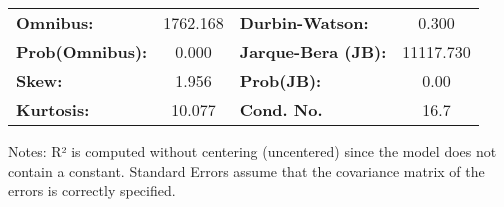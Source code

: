 \begin{center}
\begin{tabular}{lcccccc}
\bottomrule
\end{tabular}
\begin{tabular}{lclc}
\textbf{Omnibus:}       & 1762.168 & \textbf{  Durbin-Watson:     } &     0.300  \\
\textbf{Prob(Omnibus):} &   0.000  & \textbf{  Jarque-Bera (JB):  } & 11117.730  \\
\textbf{Skew:}          &   1.956  & \textbf{  Prob(JB):          } &      0.00  \\
\textbf{Kurtosis:}      &  10.077  & \textbf{  Cond. No.          } &      16.7  \\
\bottomrule
\end{tabular}
\end{center}

Notes: \newline
 [1] R² is computed without centering (uncentered) since the model does not contain a constant. \newline
 [2] Standard Errors assume that the covariance matrix of the errors is correctly specified.